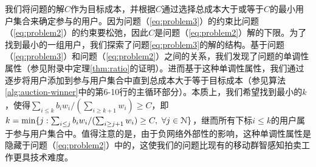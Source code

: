 	我们将问题的解$C$作为目标成本，并根据$C$通过选择总成本大于或等于$C$的最小用户集合来确定参与的用户。因为问题（\ref{eq:problem3}）的约束比问题（\ref{eq:problem2}）的约束要松弛，因此$C$是问题（\ref{eq:problem2}）解的下限。为了找到最小的一组用户，我们探索了问题\ref{eq:problem3}的解的结构。基于问题（\ref{eq:problem3}）和问题（\ref{eq:problem2}）之间的关系，我们发现了问题的{\kaishu 单调性}属性（参见附录中定理\ref{thm:ratio}的证明）。进而基于这种单调性属性，我们通过逐步将用户添加到参与用户集合中直到总成本大于等于目标成本（参见算法\ref{alg:auction-winner}中的第6-10行的主循环部分）。本质上，我们希望找到最小的$k$，使得$\sum_{i\le k}b_iw_i/(\sum_{i\ge k+1}w_i)\ge C$，即$k=\min\{j: \sum_{i\le j}b_iw_i/(\sum_{i\ge j+1}w_i)\ge C,~\forall j\in\mathcal{N}\}$，继而所有下标$i\le k$的用户属于参与用户集合中。值得注意的是，由于负网络外部性的影响，这种单调性属性是隐藏于问题（\ref{eq:problem2}）中的，这使我们的问题比现有的移动群智感知拍卖工作更具技术难度。
	
